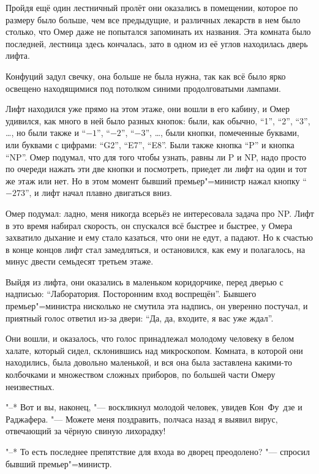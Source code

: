 Пройдя ещё один лестничный пролёт они оказались в помещении, которое по размеру
было больше, чем все предыдущие, и различных лекарств в нем было столько, что
Омер даже не попытался запоминать их названия.
Эта комната было последней, лестница здесь кончалась, зато в одном из её углов
находилась дверь лифта.

Конфуций задул свечку, она больше не была нужна, так как всё было ярко освещено
находящимися под потолком синими продолговатыми лампами.

Лифт находился уже прямо на этом этаже, они вошли в его кабину, и Омер удивился,
как много в ней было разных кнопок: были, как обычно, \enquote{1}, \enquote{2},
\enquote{3}, \ldots, но были также и \enquote{$-1$}, \enquote{$-2$},
\enquote{$-3$}, \ldots, были кнопки, помеченные буквами, или буквами с цифрами:
\enquote{G2}, \enquote{E7}, \enquote{E8}.
Были также кнопка \enquote{P} и кнопка \enquote{NP}.
Омер подумал, что для того чтобы узнать, равны ли P и NP, надо просто по очереди
нажать эти две кнопки и посмотреть, приедет ли лифт на один и тот же этаж или
нет.
Но в этом момент бывший премьер"=министр нажал кнопку \enquote{$-273$}, и лифт
начал плавно двигаться вниз.

Омер подумал: ладно, меня никогда всерьёз не интересовала задача про NP.
Лифт в это время набирал скорость, он спускался всё быстрее и быстрее, у Омера
захватило дыхание и ему стало казаться, что они не едут, а падают.
Но к счастью в конце концов лифт стал замедляться, и остановился, как ему и
полагалось, на минус двести семьдесят третьем этаже.

Выйдя из лифта, они оказались в маленьком коридорчике, перед дверью с надписью:
\enquote{Лаборатория. Посторонним вход воспрещён}.
Бывшего премьер"=министра нисколько не смутила эта надпись, он уверенно постучал,
и приятный голос ответил из-за двери:
\enquote{Да, да, входите, я вас уже ждал}.

Они вошли, и оказалось, что голос принадлежал молодому человеку в белом халате,
который сидел, склонившись над микроскопом.
Комната, в которой они находились, была довольно маленькой, и вся она была
заставлена какими-то колбочками и множеством сложных приборов, по большей части
Омеру неизвестных.

"--* Вот и вы, наконец, "--- воскликнул молодой человек, увидев Кон~Фу~дзе и
Раджафера.
"--- Можете меня поздравить, полчаса назад я выявил вирус, отвечающий за чёрную
свиную лихорадку!

"--* То есть последнее препятствие для входа во дворец преодолено? "--- спросил
бывший премьер"=министр.

